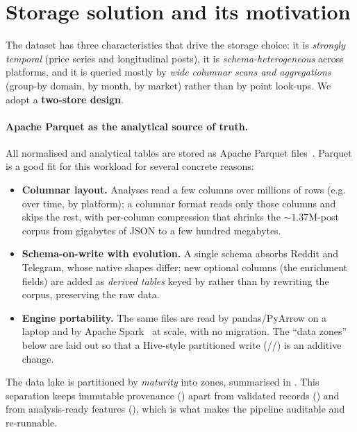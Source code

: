 \section{Storage solution and its motivation}
\label{sec:storage}
The dataset has three characteristics that drive the storage choice: it is
\emph{strongly temporal} (price series and longitudinal posts), it is
\emph{schema-heterogeneous} across platforms, and it is queried mostly by
\emph{wide columnar scans and aggregations} (group-by domain, by month, by market)
rather than by point look-ups. We adopt a \textbf{two-store design}.

\paragraph{Apache Parquet as the analytical source of truth.}
All normalised and analytical tables are stored as Apache Parquet
files~\cite{apachearrow}. Parquet is a good fit for this workload for several
concrete reasons:
\begin{itemize}
  \item \textbf{Columnar layout.} Analyses read a few columns over millions of rows
  (e.g.\  over time,  by platform); a columnar
  format reads only those columns and skips the rest, with per-column compression
  that shrinks the ${\sim}1.37$M-post corpus from gigabytes of JSON to a few hundred
  megabytes.
  \item \textbf{Schema-on-write with evolution.} A single 
  schema absorbs Reddit and Telegram, whose native shapes differ; new optional
  columns (the enrichment fields) are added as \emph{derived tables} keyed by
   rather than by rewriting the corpus, preserving the raw data.
  \item \textbf{Engine portability.} The same files are read by pandas/PyArrow on a
  laptop and by Apache Spark~\cite{zaharia2016spark} at scale, with no migration. The
  ``data zones'' below are laid out so that a Hive-style partitioned write
  (//) is an additive change.
\end{itemize}

\noindent The data lake is partitioned by \emph{maturity} into zones, summarised in
. This separation keeps immutable provenance () apart from
validated records () and from analysis-ready features
(), which is what makes the pipeline auditable and re-runnable.

